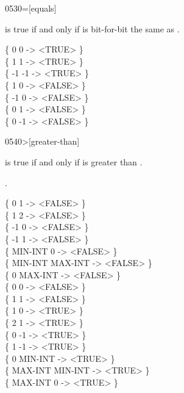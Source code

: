 \begin{worddef}{0530}{=}[equals]
\item {}

	 is true if and only if  is bit-for-bit
	the same as .

	\begin{defer}
	\testing
		\{  0  0 \word{=} -> <TRUE>  \} \\
		\{  1  1 \word{=} -> <TRUE>  \} \\
		\{ -1 -1 \word{=} -> <TRUE>  \} \\
		\{  1  0 \word{=} -> <FALSE> \} \\
		\{ -1  0 \word{=} -> <FALSE> \} \\
		\{  0  1 \word{=} -> <FALSE> \} \\
		\{  0 -1 \word{=} -> <FALSE> \} \\
	\end{defer}
\end{worddef}


\begin{worddef}[more]{0540}{>}[greater-than]
\item {}

	 is true if and only if  is greater than \param{n_2}.

\see {}.

	\begin{defer}
	\testing
		\{       0       1  -> <FALSE> \} \\
		\{       1       2  -> <FALSE> \} \\
		\{      -1       0  -> <FALSE> \} \\
		\{      -1       1  -> <FALSE> \} \\
		\{ MIN-INT       0  -> <FALSE> \} \\
		\{ MIN-INT MAX-INT  -> <FALSE> \} \\
		\{       0 MAX-INT  -> <FALSE> \} \\
		\{       0       0  -> <FALSE> \} \\
		\{       1       1  -> <FALSE> \} \\
		\{       1       0  -> <TRUE>  \} \\
		\{       2       1  -> <TRUE>  \} \\
		\{       0      -1  -> <TRUE>  \} \\
		\{       1      -1  -> <TRUE>  \} \\
		\{       0 MIN-INT  -> <TRUE>  \} \\
		\{ MAX-INT MIN-INT  -> <TRUE>  \} \\
		\{ MAX-INT       0  -> <TRUE>  \}
	\end{defer}
\end{worddef}


